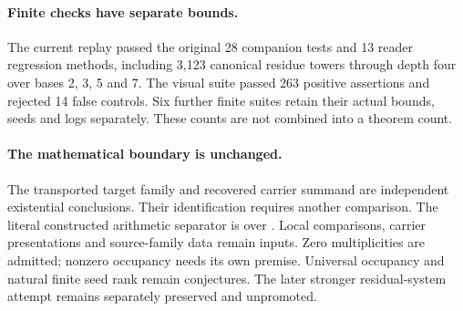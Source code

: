 \paragraph{Finite checks have separate bounds.}
The current replay passed the original 28 companion tests and 13 reader
regression methods, including 3,123 canonical residue towers through depth four
over bases 2, 3, 5 and 7. The visual suite passed 263 positive assertions and
rejected 14 false controls. Six further finite suites retain their actual bounds,
seeds and logs separately. These counts are not combined into a theorem count.

\paragraph{The mathematical boundary is unchanged.}
The transported target family and recovered carrier summand are independent
existential conclusions. Their identification requires another comparison.
The literal constructed arithmetic separator is over . Local
comparisons, carrier presentations and source-family data remain inputs.
Zero multiplicities are admitted; nonzero occupancy needs its own premise.
Universal occupancy and natural finite seed rank remain conjectures. The later
stronger residual-system attempt remains separately preserved and unpromoted.
\clearpage
